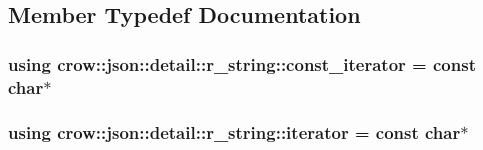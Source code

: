 \subsection{Member Typedef Documentation}
\hypertarget{structcrow_1_1json_1_1detail_1_1r__string_a7efeef8e8e48862b18217693ac68529d}{
\subsubsection[{const\-\_\-iterator}]{\setlength{\rightskip}{0pt plus 5cm}using {\bf crow\-::json\-::detail\-::r\-\_\-string\-::const\-\_\-iterator} =  const char$\ast$}}\label{structcrow_1_1json_1_1detail_1_1r__string_a7efeef8e8e48862b18217693ac68529d}
\hypertarget{structcrow_1_1json_1_1detail_1_1r__string_a3f1edea7d37fb9b1ae6b348787e3026f}{
\subsubsection[{iterator}]{\setlength{\rightskip}{0pt plus 5cm}using {\bf crow\-::json\-::detail\-::r\-\_\-string\-::iterator} =  const char$\ast$}}\label{structcrow_1_1json_1_1detail_1_1r__string_a3f1edea7d37fb9b1ae6b348787e3026f}


